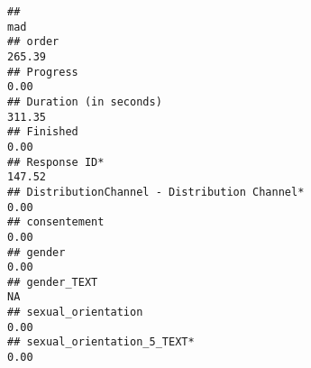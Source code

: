 \documentclass[
]{article}
\begin{document}
\begin{verbatim}
##                                                                                                                                                                                                                               mad
## order                                                                                                                                                                                                                      265.39
## Progress                                                                                                                                                                                                                     0.00
## Duration (in seconds)                                                                                                                                                                                                      311.35
## Finished                                                                                                                                                                                                                     0.00
## Response ID*                                                                                                                                                                                                               147.52
## DistributionChannel - Distribution Channel*                                                                                                                                                                                  0.00
## consentement                                                                                                                                                                                                                 0.00
## gender                                                                                                                                                                                                                       0.00
## gender_TEXT                                                                                                                                                                                                                    NA
## sexual_orientation                                                                                                                                                                                                           0.00
## sexual_orientation_5_TEXT*                                                                                                                                                                                                   0.00

\end{verbatim}
\end{document}
